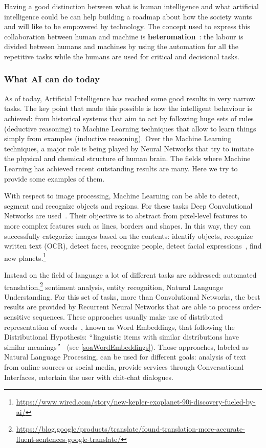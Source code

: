 Having a good distinction between what is human intelligence and what artificial intelligence could be can help building a roadmap about how the society wants and will like to be empowered by technology. The concept used to express this collaboration between human and machine is \textbf{heteromation}~\cite{ekbia2014heteromation}: the labour is divided between humans and machines by using the automation for all the repetitive tasks while the humans are used for critical and decisional tasks.

\subsubsection{What AI can do today}
As of today, Artificial Intelligence has reached some good results in very narrow tasks. The key point that made this possible is how the intelligent behaviour is achieved: from historical systems that aim to act by following huge sets of rules (deductive reasoning) to Machine Learning techniques that allow to learn things simply from examples (inductive reasoning). Over the Machine Learning techniques, a major role is being played by Neural Networks that try to imitate the physical and chemical structure of human brain. The fields where Machine Learning has achieved recent outstanding results are many. Here we try to provide some examples of them.

With respect to image processing, Machine Learning can be able to detect, segment and recognize objects and regions. For these tasks Deep Convolutional Networks are used~\cite{lecun2015deep}. Their objective is to abstract from pixel-level features to more complex features such as lines, borders and shapes. In this way, they can successfully categorize images based on the contents: identify objects, recognize written text (OCR), detect faces, recognize people, detect facial expressions~\cite{tian2005facial}, find new planets.\footnote{\url{https://www.wired.com/story/new-kepler-exoplanet-90i-discovery-fueled-by-ai/}}

Instead on the field of language a lot of different tasks are addressed: automated translation,\footnote{\url{https://blog.google/products/translate/found-translation-more-accurate-fluent-sentences-google-translate/}} sentiment analysis, entity recognition, Natural Language Understanding. For this set of tasks, more than Convolutional Networks, the best results are provided by Recurrent Neural Networks that are able to process order-sensitive sequences. These approaches usually make use of distributed representation of words~\cite{bengio2003neural}, known as Word Embeddings, that following the Distributional Hypothesis: $``$linguistic items with similar distributions have similar meanings$"$~\cite{sahlgren2008distributional} (see \ref{soaWordEmbeddings}). Those approaches, labeled as Natural Language Processing, can be used for different goals: analysis of text from online sources or social media, provide services through Conversational Interfaces, entertain the user with chit-chat dialogues.


